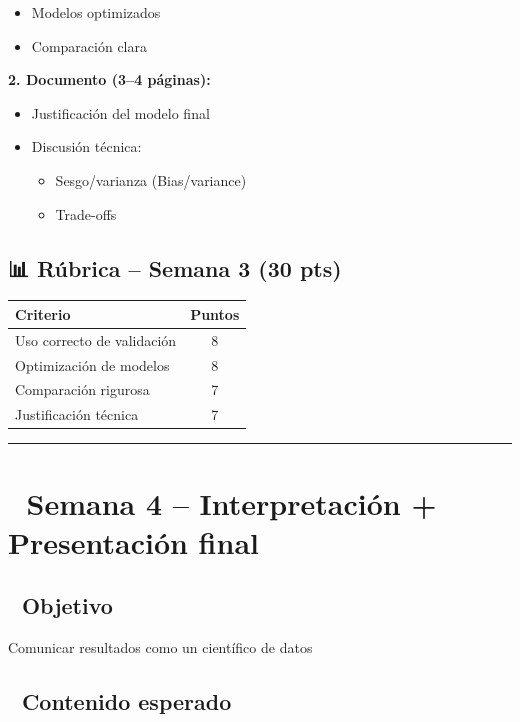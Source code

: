 \documentclass[11pt,a4paper]{article}
\begin{document}
\begin{itemize}[leftmargin=1.5cm]
\item Modelos optimizados
\item Comparación clara
\end{itemize}

\textbf{2. Documento (3--4 páginas):}

\begin{itemize}[leftmargin=1.5cm]
\item Justificación del modelo final
\item Discusión técnica:
\begin{itemize}[leftmargin=0.8cm]
\item Sesgo/varianza (Bias/variance)
\item Trade-offs
\end{itemize}
\end{itemize}

\subsection*{📊 Rúbrica -- Semana 3 (30 pts)}

\begin{table}[H]
\centering
\begin{tabular}{lc}
\toprule
\textbf{Criterio} & \textbf{Puntos} \\
\midrule
Uso correcto de validación & 8 \\
Optimización de modelos & 8 \\
Comparación rigurosa & 7 \\
Justificación técnica & 7 \\
\bottomrule
\end{tabular}
\end{table}

\hrule
\vspace{0.8cm}

\section*{📅 Semana 4 -- Interpretación + Presentación final}

\subsection*{🎯 Objetivo}

Comunicar resultados como un científico de datos

\subsection*{📌 Contenido esperado}
\end{document}

